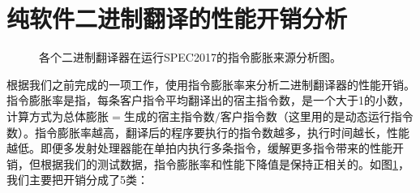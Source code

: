 \section{纯软件二进制翻译的性能开销分析}

\begin{figure}[h]
  \centering
  \caption{各个二进制翻译器在运行SPEC2017的指令膨胀来源分析图。}
  \label{img:insts_inflt_breakdown_2017}
\end{figure}

根据我们之前完成的一项工作，使用指令膨胀率来分析二进制翻译器的性能开销。指令膨胀率是指，每条客户指令平均翻译出的宿主指令数，是一个大于1的小数，计算方式为$\mbox{总体膨胀} = \mbox{生成的宿主指令数} / \mbox{客户指令数}$（这里用的是动态运行指令数）。指令膨胀率越高，翻译后的程序要执行的指令数越多，执行时间越长，性能越低。即便多发射处理器能在单拍内执行多条指令，缓解更多指令带来的性能开销，但根据我们的测试数据，指令膨胀率和性能下降值是保持正相关的。如图\ref{img:insts_inflt_breakdown_2017}，我们主要把开销分成了5类：

